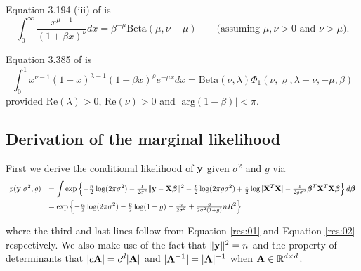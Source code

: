 \documentclass{amsart}[12pt]
\begin{document}
Equation 3.194 (iii) of \cite{Gradshteyn1988} is
\begin{equation}\label{res:03}
	\int_0^\infty \frac{ x^{\mu - 1} }{(1 + \beta x)^\nu} dx = \beta^{-\mu} \mbox{Beta}(\mu,\nu - \mu) \quad \quad \mbox{(assuming $\mu,\nu>0$ and $\nu>\mu$).}
\end{equation}

Equation 3.385 of \cite{Gradshteyn1988} is
\begin{equation} \label{res:04}
	\int_{0}^1 x^{\nu - 1} (1 - x)^{\lambda - 1}(1 - \beta x)^{\varrho} e^{-\mu x} dx = \mbox{Beta}(\nu,\lambda) \Phi_1(\nu,\varrho,\lambda+\nu,-\mu,\beta)
\end{equation}
\noindent provided $\mbox{Re}(\lambda)>0$, $\mbox{Re}(\nu)>0$ and $|\mbox{arg}(1-\beta)|<\pi$.




\subsection{Derivation of the marginal likelihood}




 
\noindent First we derive the conditional likelihood of ${\bf y}$ given $\sigma^2$ and $g$ via
$$
\begin{array}{rl}
	\displaystyle p({\bf y}|\sigma^2,g) 
	  & \displaystyle = \int \exp\left\{ 
	-\tfrac{n}{2}\log(2\pi\sigma^2) - \tfrac{1}{2\sigma^2}\|{\bf y} - {\bf X}{\boldsymbol \beta}\|^2
	-\tfrac{p}{2}\log(2\pi g\sigma^2) + \tfrac{1}{2}\log|{\bf X}^T{\bf X}| - \tfrac{1}{2g\sigma^2}{\boldsymbol \beta}^T{\bf X}^T{\bf X}{\boldsymbol \beta}
	\right\} d{\boldsymbol \beta}
	\\ [2ex]
	  & \displaystyle = \exp\left\{      
	-\tfrac{n}{2}\log(2\pi\sigma^2) 
	- \tfrac{p}{2}\log(1+g)
	- \tfrac{n}{2\sigma^2} 
	+ \tfrac{g}{2\sigma^2(1+g)} n R^2
	\right\}
\end{array}
$$

\noindent where the third and last lines follow from
Equation \ref{res:01} and Equation \ref{res:02} respectively.
We also make use of the fact that $\|{\bf y}\|^2 = n$ and the property of determinants that $|c{\bf A}| = c^d|{\bf A}|$ and $|{\bf A}^{-1}| = |{\bf A}|^{-1}$ when ${\bf A} \in{\mathbb R}^{d\times d}$.

\end{document}
